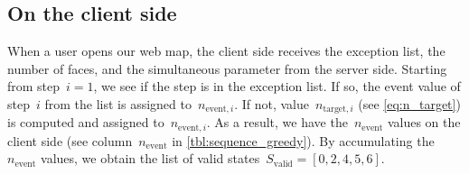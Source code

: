 \documentclass[twocolumn]{svjour3}          %
\begin{document}



\subsection{On the client side}
\label{sec:communicate_client}


When a user opens our web map,
the client side receives the exception list, the number of faces, 
and the simultaneous parameter from the server side.
Starting from step~$i=1$,
we see if the step is in the exception list.
If so, the event value of step~$i$ from the list 
is assigned to~$n_{\mathrm{event},i}$.
If not, value~$n_{\mathrm{target},i}$ (see \eq\ref{eq:n_target})
is computed and assigned to~$n_{\mathrm{event},i}$.
As a result, we have the~$n_\mathrm{event}$ values on the client side
(see column~$n_\mathrm{event}$ in \tabl\ref{tbl:sequence_greedy}).
By accumulating the~$n_\mathrm{event}$ values,
we obtain the list of valid states~$S_\mathrm{valid} = [0, 2, 4, 5, 6]$.
\end{document}
